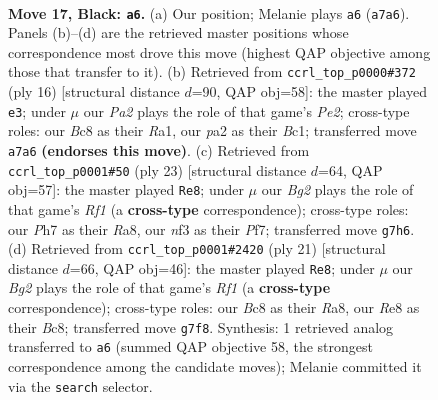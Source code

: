 \documentclass[11pt]{article}
\begin{document}
\clearpage

\begin{figure}[p]\centering
\begin{subfigure}{0.46\textwidth}\centering
\resizebox{\linewidth}{!}{%
\newchessgame
\chessboard[
  setfen={r1bqr2k/pp1pppbp/3n4/3Q4/2P5/2N2N2/PP1P1PBP/R1B2RK1 b - - 2 17},
  showmover=false,
  pgfstyle=straightmove, color=movearrow, markmove={a7-a6}
]}
\caption{}
\end{subfigure}\hfill
\begin{subfigure}{0.46\textwidth}\centering
\resizebox{\linewidth}{!}{%
\newchessgame
\chessboard[
  setfen={r1b2rk1/pp1pppbp/2n2np1/q7/2PN4/2N3P1/PP2PPBP/R1BQ1RK1 w - - 7 9},
  showmover=false,
  pgfstyle=straightmove, color=movearrow, markmove={e2-e3}
]}
\caption{}
\end{subfigure}
\\[4pt]
\begin{subfigure}{0.46\textwidth}\centering
\resizebox{\linewidth}{!}{%
\newchessgame
\chessboard[
  setfen={r1bq1rk1/pp3ppp/3b1n2/3pn3/3Q4/P1N1PN2/1P2BPPP/R1B2RK1 b - - 9 12},
  showmover=false,
  pgfstyle=straightmove, color=movearrow, markmove={f8-e8}
]}
\caption{}
\end{subfigure}\hfill
\begin{subfigure}{0.46\textwidth}\centering
\resizebox{\linewidth}{!}{%
\newchessgame
\chessboard[
  setfen={r1bq1rk1/pp3pbp/3p1np1/2n5/8/Q1N2N2/PP1PBPPP/R1B2RK1 b - - 3 11},
  showmover=false,
  pgfstyle=straightmove, color=movearrow, markmove={f8-e8}
]}
\caption{}
\end{subfigure}
\caption{\textbf{Move 17, Black: \texttt{a6}.} (a) Our position; Melanie plays \texttt{a6} (\texttt{a7a6}). Panels (b)--(d) are the retrieved master positions whose correspondence most drove this move (highest QAP objective among those that transfer to it). (b) Retrieved from \texttt{ccrl\_top\_p0000\#372} (ply 16) [structural distance $d$=90, QAP obj=58]: the master played \texttt{e3}; under $\mu$ our \emph{Pa2} plays the role of that game's \emph{Pe2}; cross-type roles: our \emph{B}c8 as their \emph{R}a1, our \emph{p}a2 as their \emph{B}c1; transferred move \texttt{a7a6} \textbf{(endorses this move)}. (c) Retrieved from \texttt{ccrl\_top\_p0001\#50} (ply 23) [structural distance $d$=64, QAP obj=57]: the master played \texttt{Re8}; under $\mu$ our \emph{Bg2} plays the role of that game's \emph{Rf1} (a \textbf{cross-type} correspondence); cross-type roles: our \emph{P}h7 as their \emph{R}a8, our \emph{n}f3 as their \emph{P}f7; transferred move \texttt{g7h6}. (d) Retrieved from \texttt{ccrl\_top\_p0001\#2420} (ply 21) [structural distance $d$=66, QAP obj=46]: the master played \texttt{Re8}; under $\mu$ our \emph{Bg2} plays the role of that game's \emph{Rf1} (a \textbf{cross-type} correspondence); cross-type roles: our \emph{B}c8 as their \emph{R}a8, our \emph{R}e8 as their \emph{B}c8; transferred move \texttt{g7f8}. Synthesis: 1 retrieved analog transferred to \texttt{a6} (summed QAP objective 58, the strongest correspondence among the candidate moves); Melanie committed it via the \texttt{search} selector.}
\label{fig:thought-m33}
\end{figure}
\end{document}
